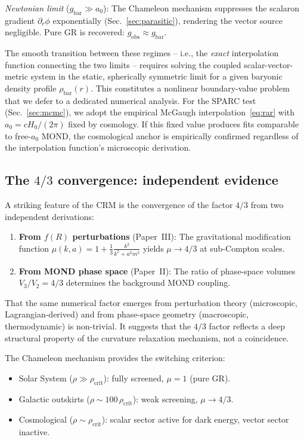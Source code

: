 \documentclass[aps,prd,twocolumn,superscriptaddress,nofootinbib]{revtex4-2}
\begin{document}
\textit{Newtonian limit} ($g_{\mathrm{bar}} \gg a_0$): The Chameleon mechanism suppresses the scalaron gradient $\partial_r\phi$ exponentially (Sec.~\ref{sec:parasitic}), rendering the vector source negligible. Pure GR is recovered: $g_{\mathrm{obs}} \approx g_{\mathrm{bar}}$.

The smooth transition between these regimes -- i.e., the \textit{exact} interpolation function connecting the two limits -- requires solving the coupled scalar-vector-metric system in the static, spherically symmetric limit for a given baryonic density profile $\rho_{\mathrm{bar}}(r)$. This constitutes a nonlinear boundary-value problem that we defer to a dedicated numerical analysis. For the SPARC test (Sec.~\ref{sec:mcmc}), we adopt the empirical McGaugh interpolation~\eqref{eq:rar} with $a_0 = cH_0/(2\pi)$ fixed by cosmology. If this fixed value produces fits comparable to free-$a_0$ MOND, the cosmological anchor is empirically confirmed regardless of the interpolation function's microscopic derivation.

\subsection{The $4/3$ convergence: independent evidence}
\label{sec:four_thirds}

A striking feature of the CRM is the convergence of the factor $4/3$ from two independent derivations:

\begin{enumerate}
\item \textbf{From $f(R)$ perturbations} (Paper~III): The gravitational modification function $\mu(k,a) = 1 + \frac{1}{3}\frac{k^2}{k^2 + a^2 m^2}$ yields $\mu \to 4/3$ at sub-Compton scales.

\item \textbf{From MOND phase space} (Paper~II): The ratio of phase-space volumes $V_3/V_2 = 4/3$ determines the background MOND coupling.
\end{enumerate}

That the same numerical factor emerges from perturbation theory (microscopic, Lagrangian-derived) and from phase-space geometry (macroscopic, thermodynamic) is non-trivial. It suggests that the $4/3$ factor reflects a deep structural property of the curvature relaxation mechanism, not a coincidence.

The Chameleon mechanism provides the switching criterion:
\begin{itemize}
\item Solar System ($\rho \gg \rho_{\mathrm{crit}}$): fully screened, $\mu = 1$ (pure GR).
\item Galactic outskirts ($\rho \sim 100\,\rho_{\mathrm{crit}}$): weak screening, $\mu \to 4/3$.
\item Cosmological ($\rho \sim \rho_{\mathrm{crit}}$): scalar sector active for dark energy, vector sector inactive.
\end{itemize}
\end{document}
